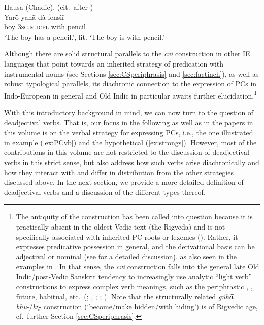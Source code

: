 \documentclass[output=paper,colorlinks,citecolor=brown]{langscibook}
\begin{document}
\begin{exe}
    \ex \label{ex:Hausa}Hausa (Chadic), \citealt[222]{Newman2000} (cit.\ after \citealt[38]{Creissels2023})\\ 
    \gll  Yarṑ  yanā̀  dà fensìr̃\\
boy \textsc{3sg.m.icpl} with pencil\\
\glt `The boy has a pencil.', lit. `The boy is with pencil.' 
\end{exe}

Although there are solid structural parallels to the \textit{cvi} construction in other IE languages that point towards an inherited strategy of  predication with instrumental nouns (see Sections \ref{sec:CSperiphrasis} and \ref{sec:factinch}), as well as robust typological parallels,  its diachronic connection to the expression of PCs in Indo-European in general and Old Indic  in particular awaits further elucidation.\footnote{The antiquity of the construction has been called into question because it is practically absent in the oldest Vedic text (the Rigveda) and is not specifically associated with inherited PC roots or lexemes (\citealt{Jamison2023}). Rather, it expresses predicative possession  in general, and the  derivational basis can be adjectival or nominal (see \citealt[45--75; 151--157]{Balles2006} for a detailed discussion), as also seen in the examples in . In that sense, the \textit{cvi} construction falls into the general late Old Indic/post-Vedic Sanskrit tendency to increasingly use analytic ``light verb'' constructions to express complex verb meanings, such as the periphrastic , , future, habitual, etc.\ (\citealt{Zehnder2011}; \citealt{Ittzes2015}, \citeyear{Ittzes2020}; \citealt{Lowe2017b}; \citealt{Grieco2023}). Note that the structurally related \textit{gúh\textbf{ā}}  \textit{bhū}-/\textit{kr̥}- construction (`become/make hidden/with hiding') is of Rigvedic age, cf.\ further Section \ref{sec:CSperiphrasis}.}


With this introductory background in mind, we can now turn to the  question of deadjectival verbs. That is, our focus in the following as well as in the papers in this volume is on the verbal strategy for expressing PCs, i.e., the one illustrated in example (\ref{ex:PCvb}) and the hypothetical (\ref{ex:strongs}). However, most of the contributions in this volume are not restricted to the discussion of deadjectival verbs in this strict sense, but also address how such verbs arise diachronically and how they interact with and differ in distribution from the other strategies discussed above. In the next section, we provide a more detailed definition of deadjectival verbs and a discussion of the different types thereof. 
\end{document}
